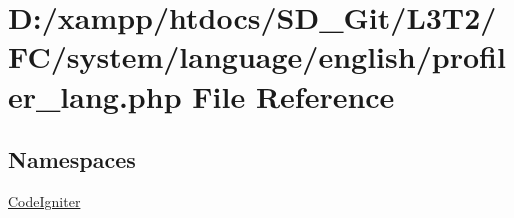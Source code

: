 \hypertarget{system_2language_2english_2profiler__lang_8php}{}\section{D\+:/xampp/htdocs/\+S\+D\+\_\+\+Git/\+L3\+T2/\+F\+C/system/language/english/profiler\+\_\+lang.php File Reference}
\label{system_2language_2english_2profiler__lang_8php}
\subsection*{Namespaces}
\begin{DoxyCompactItemize}
\item 
 \hyperlink{namespace_code_igniter}{Code\+Igniter}
\end{DoxyCompactItemize}
